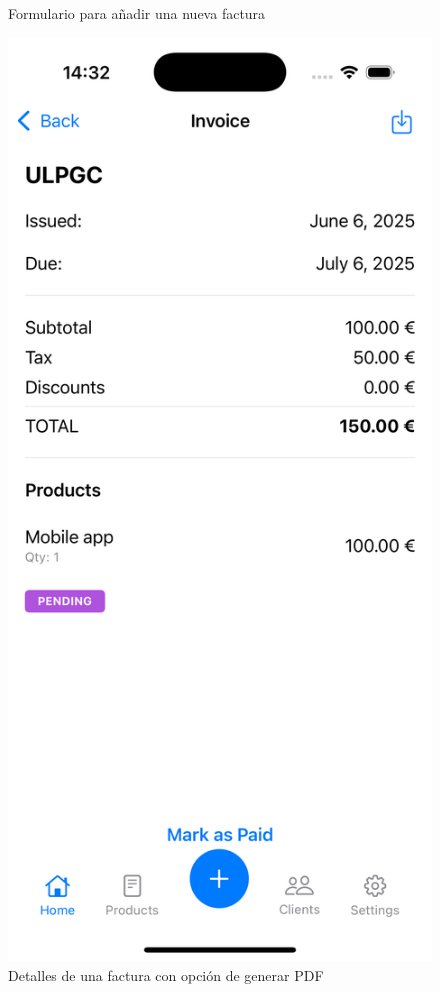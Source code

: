\begin{large}
\begin{figure}[H]
\begin{minipage}[t]{0.45\textwidth}
    \caption{Formulario para añadir una nueva factura}
    \label{fig:add_invoice}
  \end{minipage}\hfill
  \begin{minipage}[t]{0.45\textwidth}
    \centering
    \includegraphics[width=\linewidth]{Ilustraciones/ios_invoicedetails.png}
    \caption{Detalles de una factura con opción de generar PDF}
    \label{fig:invoice_details}
  \end{minipage}
\end{figure}


\end{large}
